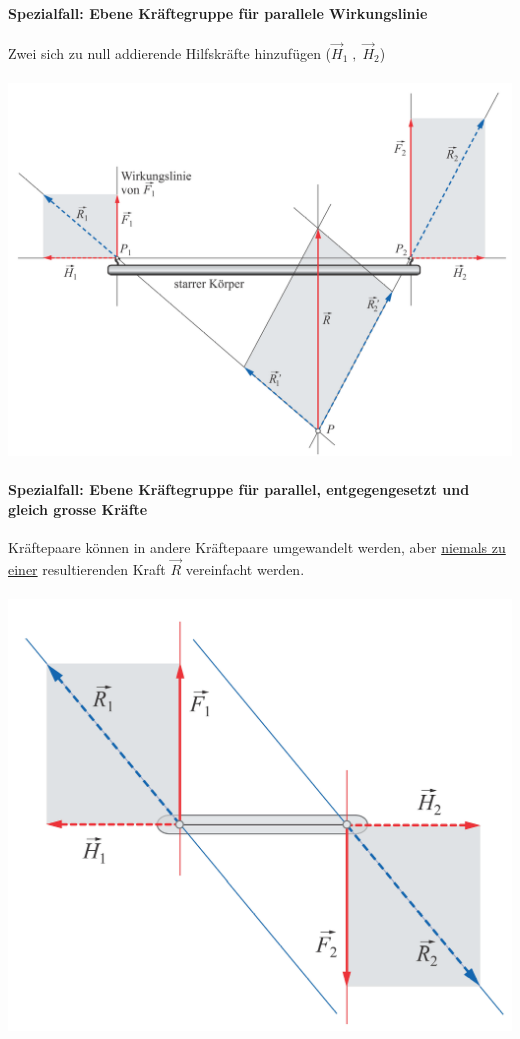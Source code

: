 	
	
		\paragraph{Spezialfall: Ebene Kräftegruppe für parallele Wirkungslinie}
		Zwei sich zu null addierende Hilfskräfte hinzufügen ($\vec{H}_1 \; , \; \vec{H}_2$) \\
		\\	
		\includegraphics[width=0.7\linewidth]{Bilder/parallele_wirkungslinien}
	
	
	
		\paragraph{Spezialfall: Ebene Kräftegruppe für parallel, entgegengesetzt und gleich grosse Kräfte}
	
		Kräftepaare können in andere Kräftepaare umgewandelt  werden, aber \underline{niemals zu einer} resultierenden Kraft $\vec{R}$ vereinfacht werden. \\
		\\
		\includegraphics[width=0.7\linewidth]{Bilder/kraeftepaar_wirkungslinien}


